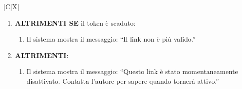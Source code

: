 \begin{tabularx}{\textwidth}{|C|X|}
{\begin{enumerate}
\begin{enumerate}
\begin{enumerate}
\begin{enumerate}
\begin{enumerate}
                    \begin{enumerate}
                        \item Il sistema interroga il DBMS per ottenere l'email dell'autore
                        \item Il sistema interroga il DBMS per aggiornare le informazioni relative al token compresa la prima visione
                        \item Il sistema invia una mail di conferma di avvenuta visione al Membro autore
                    \end{enumerate}
                    \item \textbf{ALTRIMENTI}:
                    \begin{enumerate}
                        \item Il sistema interroga il DBMS per aggiornare le informazioni relative al token (conteggio e l'orario di ultima visione)
                    \end{enumerate}
                \end{enumerate}
                \item \textbf{ALTRIMENTI}:
                \begin{enumerate}
                    \item Il sistema mostra il messaggio: ``Non \`e possibile visualizzare questo ArtID.''
                \end{enumerate}
            \end{enumerate}
            \item \textbf{ALTRIMENTI}:
            \begin{enumerate}
                \item Il sistema mostra il messaggio: ``L'ArtID desiderato non esiste pi\`u.''
            \end{enumerate}
        \end{enumerate}
        \item \textbf{ALTRIMENTI SE} il token \`e scaduto:
            \begin{enumerate}
                \item Il sistema mostra il messaggio: ``Il link non \`e pi\`u valido.''
            \end{enumerate}
        \item \textbf{ALTRIMENTI}:
            \begin{enumerate}
                \item Il sistema mostra il messaggio: ``Questo link \`e stato momentaneamente disattivato. Contatta l'autore per sapere quando torner\`a attivo.''

\end{enumerate}
\end{enumerate}
\end{enumerate}}
\end{tabularx}

